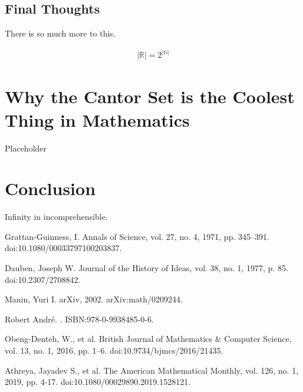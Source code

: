 \documentclass{article}
\begin{document}
\subsection{Final Thoughts}
There is so much more to this.

\begin{gather*}
|\mathbb{R}| = 2^{|\mathbb{N}|}
\end{gather*}

\section{Why the Cantor Set is the Coolest Thing in Mathematics}
Placeholder

\section{Conclusion}
Infinity in incomprehensible.

\begin{thebibliography}{1}

Grattan-Guinness, I.
\newblock Annals of Science, vol. 27, no. 4, 1971, pp. 345–391.
\newblock doi:10.1080/00033797100203837.

Dauben, Joseph W.
\newblock Journal of the History of Ideas, vol. 38, no. 1, 1977, p. 85.
\newblock doi:10.2307/2708842.

Manin, Yuri I.
\newblock arXiv, 2002.
\newblock arXiv:math/0209244.

Robert André.
.
\newblock ISBN:978-0-9938485-0-6.

Obeng-Denteh, W., et al.
\newblock British Journal of Mathematics \& Computer Science, vol. 13, no. 1, 2016, pp. 1–6.
\newblock doi:10.9734/bjmcs/2016/21435.

Athreya, Jayadev S., et al.
\newblock The American Mathematical Monthly, vol. 126, no. 1, 2019, pp. 4-17.
\newblock doi:10.1080/00029890.2019.1528121.

\end{thebibliography}
\end{document}
